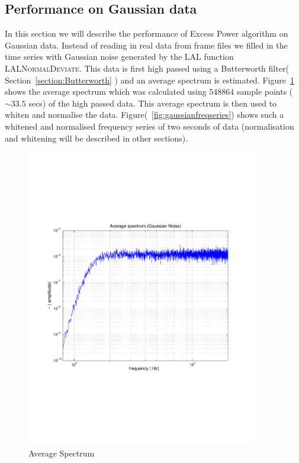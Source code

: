 \subsection{Performance on Gaussian data}
\label{section:Gaussian}
In this section we will describe the performance of Excess Power algorithm  
on Gaussian data.  Instead of reading in real data from frame files we filled 
in the time series with Gaussian noise generated by the LAL 
function \textsc{LALNormalDeviate}.  This data is first high passed using
a Butterworth filter( Section~\ref{section:Butterworth} ) and an 
average spectrum is estimated.  Figure~\ref{fig:gaussianspectrum} shows the 
average spectrum which was calculated using $548864$ sample points
($\sim 33.5$ secs) of the high passed data.  This average spectrum is then 
used to whiten and normalise the data.   Figure(~\ref{fig:gaussianfreqseries}) 
shows such a whitened and normalised frequency series of two seconds of data 
(normalisation and whitening will be described in other sections).
\begin{figure}[h]
\begin{center}
\includegraphics[width=0.9\textwidth]{figures/averagespec_psd}
\caption{Average Spectrum}
\label{fig:gaussianspectrum}
\end{center}
\end{figure}

